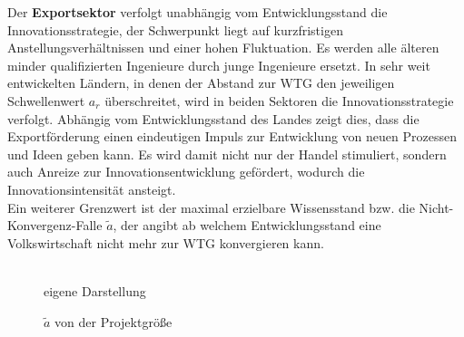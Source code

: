 Der \textbf{Exportsektor} verfolgt unabhängig vom Entwicklungsstand die \textcolor[rgb]{0.74,0.97,0.22}{Innovationsstrategie}, der Schwerpunkt liegt auf kurzfristigen Anstellungsverhältnissen und einer hohen Fluktuation. Es werden alle älteren minder qualifizierten Ingenieure durch junge Ingenieure ersetzt.
In sehr weit entwickelten Ländern, in denen der Abstand zur WTG den jeweiligen Schwellenwert $a_r$ überschreitet, wird in beiden Sektoren die \textcolor[rgb]{0.74,0.97,0.22}{Innovationsstrategie} verfolgt. Abhängig vom Entwicklungsstand des Landes zeigt dies, dass die Exportförderung einen eindeutigen Impuls zur Entwicklung von neuen Prozessen und Ideen geben kann. Es wird damit nicht nur der Handel stimuliert, sondern auch Anreize zur Innovationsentwicklung gefördert, wodurch die Innovationsintensität ansteigt. \\
Ein weiterer Grenzwert ist der maximal erzielbare Wissensstand bzw. die Nicht-Konvergenz-Falle $\tilde{a}$, der angibt ab welchem Entwicklungsstand eine Volkswirtschaft nicht mehr zur WTG konvergieren kann.\\


	\begin{figure}[htbp]
		\vspace{0.43cm}
		\\
		\hfill\footnotesize{}  eigene Darstellung
		\caption{$\widetilde{a}$ von der Projektgrö{\ss}e} 
		\label{fig:aTilde}
	\end{figure}


